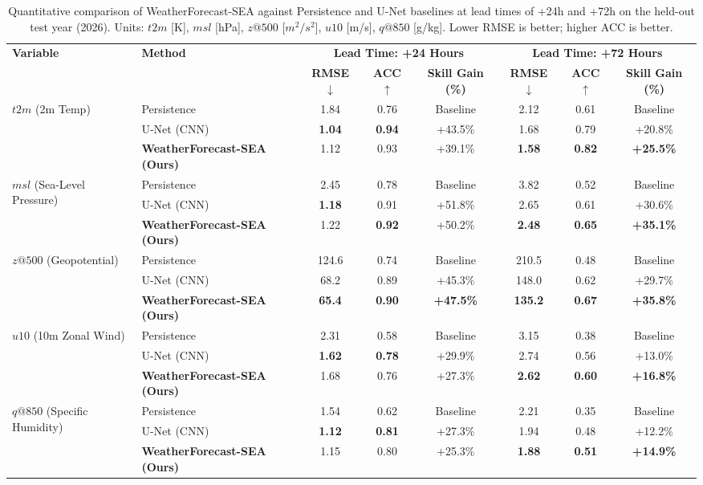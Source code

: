 \begin{table}[!t]
\centering
\caption{Quantitative comparison of WeatherForecast-SEA against Persistence and U-Net baselines at lead times of +24h and +72h on the held-out test year (2026). Units: $t2m$ [K], $msl$ [hPa], $z@500$ [$m^2/s^2$], $u10$ [m/s], $q@850$ [g/kg]. Lower RMSE is better; higher ACC is better.}
\label{tab:main_results}
\begin{tabular}{llcccccc}
\toprule
\multirow{2}{*}{\textbf{Variable}} & \multirow{2}{*}{\textbf{Method}} & \multicolumn{3}{c}{\textbf{Lead Time: +24 Hours}} & \multicolumn{3}{c}{\textbf{Lead Time: +72 Hours}} \\
\cmidrule(lr){3-5} \cmidrule(lr){6-8}
 & & \textbf{RMSE $\downarrow$} & \textbf{ACC $\uparrow$} & \textbf{Skill Gain (\%)} & \textbf{RMSE $\downarrow$} & \textbf{ACC $\uparrow$} & \textbf{Skill Gain (\%)} \\
\midrule
\multirow{3}{*}{$t2m$ (2m Temp)} 
 & Persistence & 1.84 & 0.76 & Baseline & 2.12 & 0.61 & Baseline \\
 & U-Net (CNN) & \textbf{1.04} & \textbf{0.94} & +43.5\% & 1.68 & 0.79 & +20.8\% \\
 & \textbf{WeatherForecast-SEA (Ours)} & 1.12 & 0.93 & +39.1\% & \textbf{1.58} & \textbf{0.82} & \textbf{+25.5\%} \\
\midrule
\multirow{3}{*}{$msl$ (Sea-Level Pressure)} 
 & Persistence & 2.45 & 0.78 & Baseline & 3.82 & 0.52 & Baseline \\
 & U-Net (CNN) & \textbf{1.18} & 0.91 & +51.8\% & 2.65 & 0.61 & +30.6\% \\
 & \textbf{WeatherForecast-SEA (Ours)} & 1.22 & \textbf{0.92} & +50.2\% & \textbf{2.48} & \textbf{0.65} & \textbf{+35.1\%} \\
\midrule
\multirow{3}{*}{$z@500$ (Geopotential)} 
 & Persistence & 124.6 & 0.74 & Baseline & 210.5 & 0.48 & Baseline \\
 & U-Net (CNN) & 68.2 & 0.89 & +45.3\% & 148.0 & 0.62 & +29.7\% \\
 & \textbf{WeatherForecast-SEA (Ours)} & \textbf{65.4} & \textbf{0.90} & \textbf{+47.5\%} & \textbf{135.2} & \textbf{0.67} & \textbf{+35.8\%} \\
\midrule
\multirow{3}{*}{$u10$ (10m Zonal Wind)} 
 & Persistence & 2.31 & 0.58 & Baseline & 3.15 & 0.38 & Baseline \\
 & U-Net (CNN) & \textbf{1.62} & \textbf{0.78} & +29.9\% & 2.74 & 0.56 & +13.0\% \\
 & \textbf{WeatherForecast-SEA (Ours)} & 1.68 & 0.76 & +27.3\% & \textbf{2.62} & \textbf{0.60} & \textbf{+16.8\%} \\
\midrule
\multirow{3}{*}{$q@850$ (Specific Humidity)} 
 & Persistence & 1.54 & 0.62 & Baseline & 2.21 & 0.35 & Baseline \\
 & U-Net (CNN) & \textbf{1.12} & \textbf{0.81} & +27.3\% & 1.94 & 0.48 & +12.2\% \\
 & \textbf{WeatherForecast-SEA (Ours)} & 1.15 & 0.80 & +25.3\% & \textbf{1.88} & \textbf{0.51} & \textbf{+14.9\%} \\
\bottomrule
\end{tabular}
\end{table}

